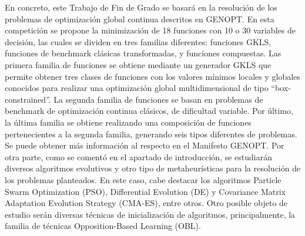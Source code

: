 En concreto, este Trabajo de Fin de Grado se basará en la resolución de los problemas de optimización global continua descritos en GENOPT. En esta competición se propone la minimización de 18 funciones con 10 o 30 variables de decisión, las cuales se dividen en tres familias diferentes: funciones GKLS, funciones de benchmark clásicas transformadas, y funciones compuestas.
Las primera familia de funciones se obtiene mediante un generador GKLS que permite obtener tres clases de funciones con los valores mínimos locales y globales conocidos para realizar una optimización global multidimensional de tipo “box-constrained”.
La segunda familia de funciones se basan en problemas de benchmark de optimización continua clásicos, de dificultad variable.
\newline
Por último, la última familia se obtiene realizando una composición de funciones pertenecientes a la segunda familia, generando seis tipos diferentes de problemas.	
Se puede obtener más información al respecto en el Manifesto GENOPT.
Por otra parte, como se comentó en el apartado de introducción, se estudiarán diversos algoritmos evolutivos y otro tipo de metaheurísticas para la resolución de los problemas planteados. En este caso, cabe destacar los algoritmos Particle Swarm Optimization (PSO), Differential Evolution (DE) y Covariance Matrix Adaptation Evolution Strategy (CMA-ES), entre otros. Otro posible objeto de estudio serán diversas técnicas de inicialización de algoritmos, principalmente, la familia de técnicas Opposition-Based Learning (OBL).
